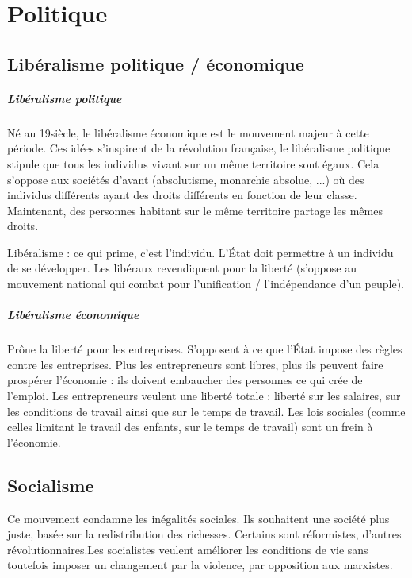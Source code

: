 \chapter{Politique}
\section{Libéralisme politique / économique}

\paragraph{Libéralisme politique} Né au 19\ieme siècle, le libéralisme économique est le mouvement majeur à cette période. Ces idées s'inspirent de la révolution française, le libéralisme politique stipule que tous les individus vivant sur un même territoire sont égaux. Cela s'oppose aux sociétés d'avant (absolutisme, monarchie absolue, ...) où des individus différents ayant des droits différents en fonction de leur classe. Maintenant, des personnes habitant sur le même territoire partage les mêmes droits.

Libéralisme : ce qui prime, c'est l'individu. L'\'Etat doit permettre à un individu de se développer. Les libéraux revendiquent pour la liberté (s'oppose au mouvement national qui combat pour l'unification / l'indépendance d'un peuple).

\paragraph{Libéralisme économique} Prône la liberté pour les entreprises. S'opposent à ce que l'\'Etat impose des règles contre les entreprises. Plus les entrepreneurs sont libres, plus ils peuvent faire prospérer l'économie : ils doivent embaucher des personnes ce qui crée de l'emploi. Les entrepreneurs veulent une liberté totale : liberté sur les salaires, sur les conditions de travail ainsi que sur le temps de travail. Les lois sociales (comme celles limitant le travail des enfants, sur le temps de travail) sont un frein à l'économie.




\section{Socialisme}
Ce mouvement condamne les inégalités sociales. Ils souhaitent une société plus juste, basée sur la redistribution des richesses. Certains sont réformistes, d'autres révolutionnaires.Les socialistes veulent améliorer les conditions de vie sans toutefois imposer un changement par la violence, par opposition aux marxistes. 

